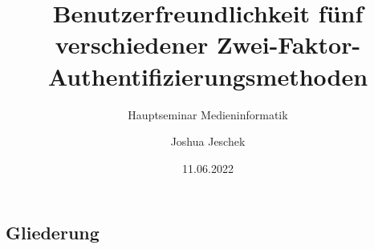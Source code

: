 \usepackage[T1]{fontenc}
\usepackage[utf8]{inputenc}
\usepackage[ngerman]{babel}
\usepackage{tikz} %
\usepackage{endnotes} %
\usepackage[nobiblatex]{xurl} %
\usepackage{pgfplotstable} %
\usepackage{ tipa } %

\usepackage{nameref}
\makeatletter
\newcommand*{\currentsectionname}{\@currentlabelname}
\makeatother



\graphicspath{ {./images/} }

\nocite{*}


\newcommand{\Title}{Benutzerfreundlichkeit fünf verschiedener Zwei-Faktor-Authentifizierungsmethoden}
\newcommand{\ShortTitle}{Zwei-Faktor-Authentifizierungsmethoden}
\title[\ShortTitle]{\Title}
\subtitle{Hauptseminar Medieninformatik}
\author{Joshua Jeschek}
\date{11.06.2022}



\tucthreeheadlines{}
\frame{\titlepage}

\tuctwoheadlines{}


\subsection*{Gliederung}
\frame{\frametitle{\currentsectionname}\tableofcontents}

%
%




